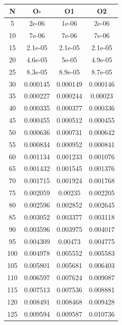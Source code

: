 \begin{center}
\begin{tabular}{| c | c | c | c |}
\hline
\textbf{N} & \textbf{O-} & \textbf{O1} & \textbf{O2} \\ \hline
5 & 2e-06 & 1e-06 & 2e-06 \\ \hline
10 & 7e-06 & 7e-06 & 7e-06 \\ \hline
15 & 2.1e-05 & 2.1e-05 & 2.1e-05 \\ \hline
20 & 4.6e-05 & 5e-05 & 4.9e-05 \\ \hline
25 & 8.3e-05 & 8.9e-05 & 8.7e-05 \\ \hline
30 & 0.000145 & 0.000149 & 0.000146 \\ \hline
35 & 0.000227 & 0.000244 & 0.00023 \\ \hline
40 & 0.000335 & 0.000377 & 0.000336 \\ \hline
45 & 0.000455 & 0.000512 & 0.000455 \\ \hline
50 & 0.000636 & 0.000731 & 0.000642 \\ \hline
55 & 0.000834 & 0.000952 & 0.000841 \\ \hline
60 & 0.001134 & 0.001233 & 0.001076 \\ \hline
65 & 0.001432 & 0.001545 & 0.001376 \\ \hline
70 & 0.001715 & 0.001924 & 0.001768 \\ \hline
75 & 0.002059 & 0.00235 & 0.002205 \\ \hline
80 & 0.002596 & 0.002852 & 0.002645 \\ \hline
85 & 0.003052 & 0.003377 & 0.003118 \\ \hline
90 & 0.003596 & 0.003975 & 0.004017 \\ \hline
95 & 0.004309 & 0.00473 & 0.004775 \\ \hline
100 & 0.004978 & 0.005552 & 0.005583 \\ \hline
105 & 0.005801 & 0.005681 & 0.006403 \\ \hline
110 & 0.006597 & 0.007624 & 0.009087 \\ \hline
115 & 0.007513 & 0.007536 & 0.008881 \\ \hline
120 & 0.008491 & 0.008468 & 0.009428 \\ \hline
125 & 0.009594 & 0.009587 & 0.010736 \\ \hline
\hline
\end{tabular}
\end{center}
